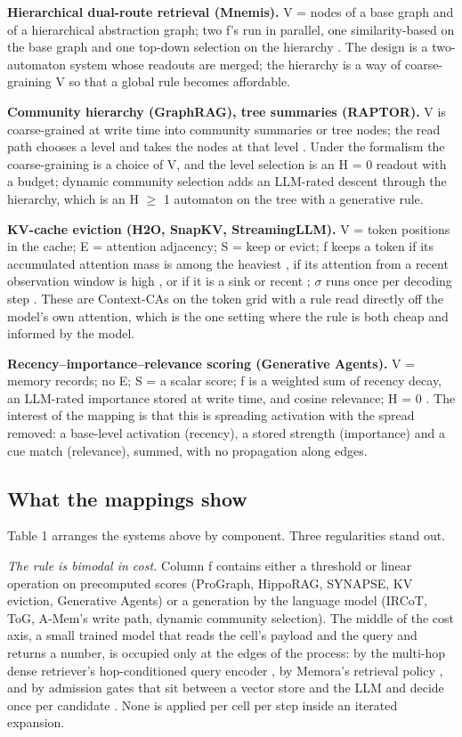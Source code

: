 \documentclass[11pt]{article}
\begin{document}
\textbf{Hierarchical dual-route retrieval (Mnemis).} V = nodes of a base graph and of a hierarchical abstraction graph; two f's run in parallel, one similarity-based on the base graph and one top-down selection on the hierarchy \cite{mnemis}. The design is a two-automaton system whose readouts are merged; the hierarchy is a way of coarse-graining V so that a global rule becomes affordable.

\textbf{Community hierarchy (GraphRAG), tree summaries (RAPTOR).} V is coarse-grained at write time into community summaries or tree nodes; the read path chooses a level and takes the nodes at that level \cite{graphrag,raptor}. Under the formalism the coarse-graining is a choice of V, and the level selection is an H = 0 readout with a budget; dynamic community selection \cite{graphrag-dynamic} adds an LLM-rated descent through the hierarchy, which is an H $\geq$ 1 automaton on the tree with a generative rule.

\textbf{KV-cache eviction (H2O, SnapKV, StreamingLLM).} V = token positions in the cache; E = attention adjacency; S = keep or evict; f keeps a token if its accumulated attention mass is among the heaviest \cite{h2o}, if its attention from a recent observation window is high \cite{snapkv}, or if it is a sink or recent \cite{streamingllm}; $\sigma$ runs once per decoding step \cite{h2o,snapkv,streamingllm}. These are Context-CAs on the token grid with a rule read directly off the model's own attention, which is the one setting where the rule is both cheap and informed by the model.

\textbf{Recency--importance--relevance scoring (Generative Agents).} V = memory records; no E; S = a scalar score; f is a weighted sum of recency decay, an LLM-rated importance stored at write time, and cosine relevance; H = 0 \cite{generativeagents}. The interest of the mapping is that this is spreading activation with the spread removed: a base-level activation (recency), a stored strength (importance) and a cue match (relevance), summed, with no propagation along edges.

\subsection{What the mappings show}

Table 1 arranges the systems above by component. Three regularities stand out.

\emph{The rule is bimodal in cost.} Column f contains either a threshold or linear operation on precomputed scores (ProGraph, HippoRAG, SYNAPSE, KV eviction, Generative Agents) or a generation by the language model (IRCoT, ToG, A-Mem's write path, dynamic community selection). The middle of the cost axis, a small trained model that reads the cell's payload and the query and returns a number, is occupied only at the edges of the process: by the multi-hop dense retriever's hop-conditioned query encoder \cite{mdr}, by Memora's retrieval policy \cite{memora}, and by admission gates that sit between a vector store and the LLM and decide once per candidate \cite{memgate,lightmem-slm}. None is applied per cell per step inside an iterated expansion.
\end{document}
